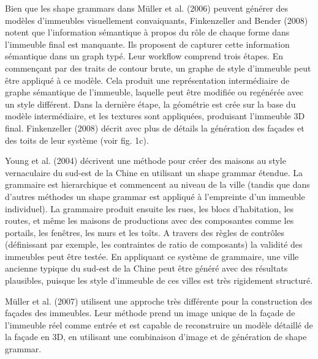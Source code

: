 \documentclass[11pt]{report}
\begin{document}
Bien que les shape grammars dans Müller et al. (2006) peuvent générer des modèles d'immeubles visuellement convaiquants, Finkenzeller and Bender (2008) notent que l'information sémantique à propos du rôle de chaque forme dans l'immeuble final est manquante. Ils proposent de capturer cette information sémantique dans un graph typé. Leur workflow comprend trois étapes. En commençant par des traits de contour brute, un graphe de style d'immeuble peut être appliqué à ce modèle. Cela produit une représentation intermédiaire de graphe sémantique de l'immeuble, laquelle peut être modifiée ou regénérée avec un style différent. Dans la dernière étape, la géométrie est crée sur la base du modèle intermédiaire, et les textures sont appliquées, produisant l'immeuble 3D final. Finkenzeller (2008) décrit avec plus de détails la génération des façades et des toits de leur système (voir fig. 1c). \newline

Young et al. (2004) décrivent une méthode pour créer des maisons au style vernaculaire du sud-est de la Chine en utilisant un shape grammar étendue. La grammaire est hierarchique et commencent au niveau de la ville (tandis que dans d'autres méthodes un shape grammar est appliqué à l'empreinte d'un immeuble individuel). La grammaire produit ensuite les rues, les blocs d'habitation, les routes, et même les maisons de productions avec des composantes comme les portails, les fenêtres, les murs et les toîts. A travers des règles de contrôles (définissant par exemple, les contraintes de ratio de composants) la validité des immeubles peut être testée. En appliquant ce système de grammaire, une ville ancienne typique du sud-est de la Chine peut être généré avec des résultats plausibles, puisque les style d'immeuble de ces villes est très rigidement structuré. \newline

Müller et al. (2007) utilisent une approche très différente pour la construction des façades des immeubles. Leur méthode prend un image unique de la façade de l'immeuble réel comme entrée et est capable de reconstruire un modèle détaillé de la façade en 3D, en utilisant une combinaison d'image et de génération de shape grammar. \newline
\end{document}
